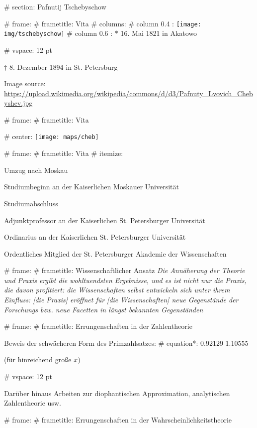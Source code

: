 # section: Pafnutij Tschebyschow

# frame:
  # frametitle: Vita
  # columns:
    # column {0.4 \textwidth}:
      \texttt{[image: img/tschebyschow]}
    # column {0.6 \textwidth}:
      $*$ 16. Mai 1821 in Akatowo

      # vspace: 12 pt

      $\dagger$ 8. Dezember 1894 in St. Petersburg

  \color{mDarkTeal!40!white}
  \tiny{Image source: \url{https://upload.wikimedia.org/wikipedia/commons/d/d3/Pafnuty_Lvovich_Chebyshev.jpg}}

# frame:
  # frametitle: Vita

  # center:
    \texttt{[image: maps/cheb]}

# frame:
  # frametitle: Vita
    # itemize:
      \item[1832 (11)] Umzug nach Moskau
      \item[1837 (16)] Studiumbeginn an der Kaiserlichen Moskauer Universität
      \item[1841 (20)] Studiumabschluss
      \item[1847 (26)] Adjunktprofessor an der Kaiserlichen St. Petersburger Universität
      \item[1850 (29)] Ordinarius an der Kaiserlichen St. Petersburger Universität
      \item[1858 (37)] Ordentliches Mitglied der St. Petersburger Akademie der Wissenschaften

# frame:
  # frametitle: Wissenschaftlicher Ansatz
    \emph{\glqq{}Die Annäherung der Theorie und Praxis ergibt die wohltuendsten Ergebnisse,
    und es ist nicht nur die Praxis, die davon profitiert:
    die Wissenschaften selbst entwickeln sich unter ihrem Einfluss:
    [die Praxis] eröffnet für [die Wissenschaften] neue Gegenstände der Forschungs
    bzw. neue Facetten in längst bekannten Gegenständen\grqq}

# frame:
  # frametitle: Errungenschaften in der Zahlentheorie

  Beweis der schwächeren Form des Primzahlsatzes:
  # equation*:
    \num{0.92129} \leqslant {} \leqslant \num{1.10555}

  (für hinreichend große $x$)

  # vspace: 12 pt

  Darüber hinaus Arbeiten zur diophantischen Approximation,
  analytischen Zahlentheorie usw.

# frame:
  # frametitle: Errungenschaften in der Wahrscheinlichkeitstheorie

